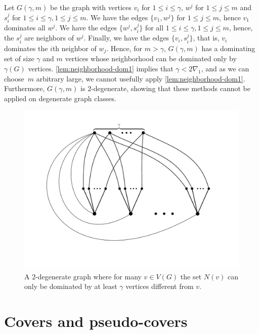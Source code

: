 \begin{example}
Let $G(\gamma,m)$ be the graph with vertices $v_i$ for $1\leq i\leq \gamma$,
$w^j$ for $1\leq j\leq m$ and $s_i^j$ for $1\leq i\leq \gamma, 1\leq j\leq m$.
We have the edges $\{v_1, w^j\}$ for $1\leq j\leq m$, hence $v_1$
dominates all $w^j$. We have the edges $\{w^j, s_i^j\}$ for all $1\leq i\leq \gamma,
1\leq j\leq m$, hence, the $s_i^j$ are neighbors of $w^j$. Finally,
we have the edges $\{v_i, s_i^j\}$, that is, $v_i$ dominates the $i$th
neighbor of $w_j$. Hence, for $m>\gamma$,
$G(\gamma, m)$ has a dominating set of size
$\gamma$ and $m$ vertices whose neighborhood can be dominated
only by $\gamma(G)$ vertices. \cref{lem:neighborhood-dom1} implies
that $\gamma < 2\nabla_1$, and as we can choose~$m$ arbitrary
large, we cannot usefully apply \cref{lem:neighborhood-dom1}.
Furthermore, $G(\gamma,m)$ is
\mbox{$2$-degenerate}, showing that these methods cannot be applied on
degenerate graph classes.

\begin{center}
  \begin{figure}
    \includegraphics[scale=0.3]{ds1.png}
    \caption{ A $2$-degenerate graph where for many $v\in V(G)$ the set $N(v)$ can only be dominated by at least $\gamma$ vertices different from $v$. }
  \end{figure}
\end{center}
\end{example}


%
\section{Covers and pseudo-covers}

